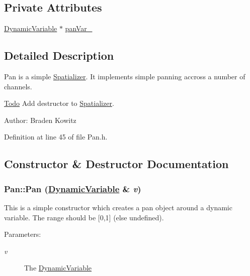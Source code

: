 \subsection*{Private Attributes}
\begin{CompactItemize}
\item 
\hyperlink{classDynamicVariable}{Dynamic\-Variable} $\ast$ \hyperlink{classPan_r0}{pan\-Var\_\-}
\end{CompactItemize}


\subsection{Detailed Description}
Pan is a simple \hyperlink{classSpatializer}{Spatializer}. It implements simple panning accross a number of channels. 

\begin{Desc}
\item[\hyperlink{todo__todo000001}{Todo}]Add destructor to \hyperlink{classSpatializer}{Spatializer}.\end{Desc}
\begin{Desc}
\item[Author:]Braden Kowitz \end{Desc}




Definition at line 45 of file Pan.h.

\subsection{Constructor \& Destructor Documentation}
\hypertarget{classPan_a0}{
\subsubsection[Pan]{\setlength{\rightskip}{0pt plus 5cm}Pan::Pan (\hyperlink{classDynamicVariable}{Dynamic\-Variable} \& {\em v})}}
\label{classPan_a0}


This is a simple constructor which creates a pan object around a dynamic variable. The range should be \mbox{[}0,1\mbox{]} (else undefined). \begin{Desc}
\item[Parameters:]
\begin{description}
\item[{\em v}]The \hyperlink{classDynamicVariable}{Dynamic\-Variable} \end{description}
\end{Desc}


